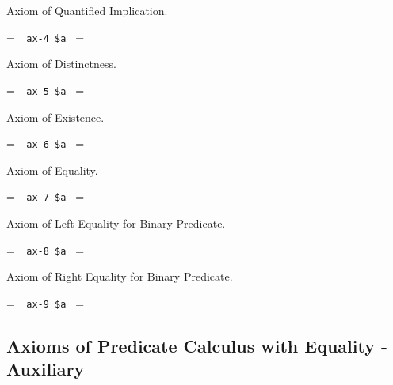 \noindent Axiom of Quantified Implication.

\setbox\startprefix=\hbox{\tt \ \ ax-4\ \$a\ }
\setbox\contprefix=\hbox{\tt \ \ \ \ \ \ \ \ \ \ }
\startm
\m{\vdash}\m{(}\m{\forall}\m{(}\m{\forall}\m{\varphi}\m{\rightarrow}\m{
\psi}\m{)}\m{\rightarrow}\m{(}\m{\forall}\m{\varphi}\m{\rightarrow}\m{
\forall}\m{\psi}\m{)}\m{)}
\endm

\noindent Axiom of Distinctness.

\setbox\startprefix=\hbox{\tt \ \ ax-5\ \$a\ }
\setbox\contprefix=\hbox{\tt \ \ \ \ \ \ \ \ \ \ }
\startm
\m{\vdash}\m{(}\m{\varphi}\m{\rightarrow}\m{\forall}\m{\varphi}\m{)}\m{ }\m{ }\m{ }\m{\varphi}\m{ }\m{(}\m{ }\m{ }\m{ }\m{ }\m{ }\m{\varphi}\m{)}
\endm

\noindent Axiom of Existence.

\setbox\startprefix=\hbox{\tt \ \ ax-6\ \$a\ }
\setbox\contprefix=\hbox{\tt \ \ \ \ \ \ \ \ \ \ }
\startm
\m{\vdash}\m{(}\m{\forall}\m{(}\m{=}\m{\rightarrow}\m{\forall}
\m{\varphi}\m{)}\m{\rightarrow}\m{\varphi}\m{)}
\endm

\noindent Axiom of Equality.

\setbox\startprefix=\hbox{\tt \ \ ax-7\ \$a\ }
\setbox\contprefix=\hbox{\tt \ \ \ \ \ \ \ \ \ \ }
\startm
\m{\vdash}\m{(}\m{=}\m{\rightarrow}\m{(}\m{=}\m{
\rightarrow}\m{=}\m{)}\m{)}
\endm

\noindent Axiom of Left Equality for Binary Predicate.

\setbox\startprefix=\hbox{\tt \ \ ax-8\ \$a\ }
\setbox\contprefix=\hbox{\tt \ \ \ \ \ \ \ \ \ \ \ }
\startm
\m{\vdash}\m{(}\m{=}\m{\rightarrow}\m{(}\m{\in}\m{
\rightarrow}\m{\in}\m{)}\m{)}
\endm

\noindent Axiom of Right Equality for Binary Predicate.

\setbox\startprefix=\hbox{\tt \ \ ax-9\ \$a\ }
\setbox\contprefix=\hbox{\tt \ \ \ \ \ \ \ \ \ \ \ }
\startm
\m{\vdash}\m{(}\m{=}\m{\rightarrow}\m{(}\m{\in}\m{
\rightarrow}\m{\in}\m{)}\m{)}
\endm


\subsection{Axioms of Predicate Calculus with Equality - Auxiliary}

